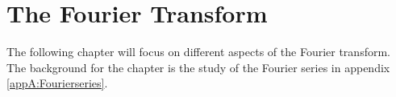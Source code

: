 \chapter{The Fourier Transform} \label{ch6}
The following chapter will focus on different aspects of the Fourier transform. The background for the chapter is the study of the Fourier series in appendix \ref{appA:Fourierseries}.







